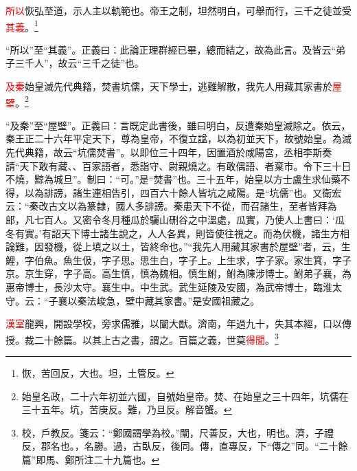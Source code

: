 \textcolor{red}{所以}恢弘至道，示人主以軌範也。帝王之制，坦然明白，可舉而行，三千之徒並受\textcolor{red}{其義}。\footnote{恢，苦回反，大也。坦，土管反。}

{\noindent\shu{}\fzkt “所以”至“其義”。正義曰：此論正理群經已畢，總而結之，故為此言。及皆云“弟子三千人”，故云“三千之徒”也。 \par}

\textcolor{red}{及秦}始皇滅先代典籍，焚書坑儒，天下學士，逃難解散，我先人用藏其家書於\textcolor{red}{屋壁}。\footnote{始皇名政，二十六年初並六國，自號始皇帝。焚、在始皇之三十四年，坑儒在三十五年。坑，苦庚反。難，乃旦反。解音蟹。}

{\noindent\shu{}\fzkt “及秦”至“屋壁”。正義曰：言既定此書後，雖曰明白，反遭秦始皇滅除之。依云，秦王正二十六年平定天下，尊為皇帝，不復立諡，以為初並天下，故號始皇。為滅先代典籍，故云“坑儒焚書”。以即位三十四年，因置酒於咸陽宮，丞相李斯奏請“天下敢有藏、、百家語者，悉詣守、尉親燒之。有敢偶語、者棄市。令下三十日不燒，黥為城旦”。制曰：“可。”是“焚書”也。三十五年，始皇以方士盧生求仙藥不得，以為誹謗，諸生連相告引，四百六十餘人皆坑之咸陽。是“坑儒”也。又衛宏云：“秦改古文以為篆隸，國人多誹謗。秦患天下不從，而召諸生，至者皆拜為郎，凡七百人。又密令冬月種瓜於驪山硎谷之中溫處，瓜實，乃使人上書曰：‘瓜冬有實。’有詔天下博士諸生說之，人人各異，則皆使往視之。而為伏機，諸生方相論難，因發機，從上填之以土，皆終命也。”“我先人用藏其家書於屋壁”者，云，生鯉，字伯魚。魚生伋，字子思。思生白，字子上。上生求，字子家。家生箕，字子京。京生穿，字子高。高生慎，慎為魏相。慎生鮒，鮒為陳涉博士。鮒弟子襄，為惠帝博士，長沙太守。襄生中。中生武。武生延陵及安國，為武帝博士，臨淮太守。云：“子襄以秦法峻急，壁中藏其家書。”是安國祖藏之。 \par}

\textcolor{red}{漢室}龍興，開設學校，旁求儒雅，以闡大猷。濟南，年過九十，失其本經，口以傳授。裁二十餘篇。以其上古之書，謂之。百篇之義，世莫\textcolor{red}{得聞}。\footnote{校，戶教反。箋云：“鄭國謂學為校。”闡，尺善反，大也，明也。濟，子禮反，郡名也。，名勝。過，古臥反，後同。傳，直專反，下“傳之”同。“二十餘篇”即馬、鄭所注二十九篇也。}

